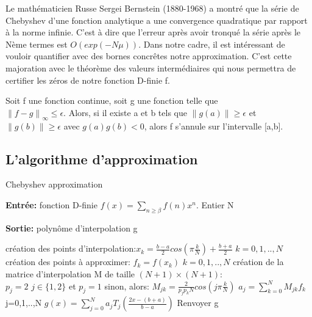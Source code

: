 \documentclass[a4paper,10.5pt]{article}
\begin{document}
	
	Le mathématicien Russe Sergei Bernstein (1880-1968) a montré que la série de Chebyshev d'une fonction analytique a une convergence quadratique par rapport à la norme infinie. C'est à dire que l'erreur après avoir tronqué la série après le Nème termes est $O(exp(-N\mu))$. Dans notre cadre, il est intéressant de vouloir quantifier avec des bornes concrêtes notre approximation.
	C'est cette majoration avec le théorème des valeurs intermédiaires qui nous permettra de certifier les zéros de notre fonction D-finie f.
	
	
	\begin{proposition}
		Soit f une fonction continue, soit g une fonction telle que \\
		$\left\|f-g \right\|_{\infty} \leq \epsilon$. Alors, si il existe a et b tels que $\left\|g(a)\right\| \geq \epsilon$ et $\left\|g(b)\right\| \geq \epsilon$ avec $g(a)g(b) < 0$, alors f s'annule sur l'intervalle [a,b].
		
	\end{proposition}
	
	\subsection{L'algorithme d'approximation}
	
	
	\begin{algorithm}
		\caption{Chebyshev approximation}
		
		\vspace{2mm}
		
		\textbf{Entrée:} fonction D-finie $f(x)=\sum_{n \geq\beta} f(n)x^{n}$. Entier N
		
		\textbf{Sortie:} polynôme d'interpolation g
		
		\begin{algorithmic}[1]
			
			\STATE création des points d'interpolation:$x_{k}=\frac{b-a}{2}cos(\pi\frac{k}{N})+\frac{b+a}{2}$  $k=0,1,..,N$
			\STATE création des points à approximer: $f_{k}=f(x_{k})$ $k=0,1,..,N$
			\STATE création de la matrice d'interpolation M de taille $(N+1)\times (N+1)$:\\
			$p_{j}=2$ $j\in\{1,2\}$ et $p_{j}=1$ sinon, alors:
			$M_{jk}=\frac{2}{p_{j}p_{k}N}cos(j\pi\frac{k}{N})$
			\STATE $a_{j}=\sum_{k=0}^{N}M_{jk}f_{k}$ j=0,1,..,N
			\STATE $g(x)=\sum_{j=0}^{N}a_{j}T_{j}(\frac{2x-(b+a)}{b-a})$
			\STATE Renvoyer g
		\end{algorithmic}
		
	\end{algorithm}
	
\end{document}
